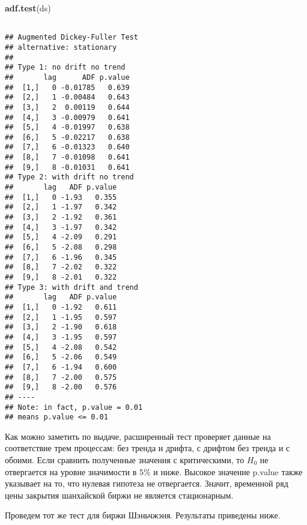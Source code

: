 \documentclass[a4paper,12pt]{article}
\newenvironment{Shaded}{\begin{snugshade}}{\end{snugshade}}
\newcommand{\KeywordTok}[1]{\textcolor[rgb]{0.13,0.29,0.53}{\textbf{#1}}}
\newcommand{\NormalTok}[1]{#1}
\begin{document}
\begin{Shaded}
\begin{Highlighting}[]
\KeywordTok{adf.test}\NormalTok{(ds)}
\end{Highlighting}
\end{Shaded}
\begin{multicols}{2}
\begin{Verbatim}[fontsize=\small]

## Augmented Dickey-Fuller Test
## alternative: stationary
##
## Type 1: no drift no trend
##       lag      ADF p.value
##  [1,]   0 -0.01785   0.639
##  [2,]   1 -0.00484   0.643
##  [3,]   2  0.00119   0.644
##  [4,]   3 -0.00979   0.641
##  [5,]   4 -0.01997   0.638
##  [6,]   5 -0.02217   0.638
##  [7,]   6 -0.01323   0.640
##  [8,]   7 -0.01098   0.641
##  [9,]   8 -0.01031   0.641
## Type 2: with drift no trend
##       lag   ADF p.value
##  [1,]   0 -1.93   0.355
##  [2,]   1 -1.97   0.342
##  [3,]   2 -1.92   0.361
##  [4,]   3 -1.97   0.342
##  [5,]   4 -2.09   0.291
##  [6,]   5 -2.08   0.298
##  [7,]   6 -1.96   0.345
##  [8,]   7 -2.02   0.322
##  [9,]   8 -2.01   0.322
## Type 3: with drift and trend
##       lag   ADF p.value
##  [1,]   0 -1.92   0.611
##  [2,]   1 -1.95   0.597
##  [3,]   2 -1.90   0.618
##  [4,]   3 -1.95   0.597
##  [5,]   4 -2.08   0.542
##  [6,]   5 -2.06   0.549
##  [7,]   6 -1.94   0.600
##  [8,]   7 -2.00   0.575
##  [9,]   8 -2.00   0.576
## ----
## Note: in fact, p.value = 0.01
## means p.value <= 0.01
\end{Verbatim}
\end{multicols}
Как можно заметить по выдаче, расширенный тест проверяет данные на соответствие трем процессам: без тренда и дрифта, с дрифтом без тренда и с обоими. Если сравнить полученные значения с критическими, то $H_0$ не отвергается на уровне значимости в $5\%$ и ниже. Высокое значение p.value также указывает на то, что нулевая гипотеза не отвергается. Значит, временной ряд цены закрытия шанхайской биржи не является стационарным.

Проведем тот же тест для биржи Шэньчжэня. Результаты приведены ниже.
\end{document}
